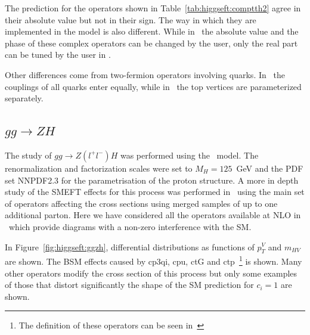 The prediction for the operators shown in Table~\ref{tab:higgseft:comptth2} agree in their absolute value but not in their sign. The way in which they are implemented in the model is also different. While in \SMEFTsim\ the absolute value and the phase of these complex operators can be changed by the user, only the real part can be tuned by the user in \SMEFTatNLO.

Other differences come from two-fermion operators involving quarks. In \SMEFTsim\ the couplings of all quarks enter equally, while in \SMEFTatNLO\ the top vertices are parameterized separately. 


\subsection{$gg\to ZH$}
\label{sec:higgseft:ggzh}
The study of  $gg\to Z(l^{+}l^{-})H$ was performed using the \SMEFTatNLO\ model. The renormalization and factorization scales were set to $M_H=125$~GeV and the PDF set NNPDF2.3 for the parametrisation of the proton structure. A more in depth study of the SMEFT effects for this process was performed in~\cite{Bylund:2016phk} using the main set of operators affecting the cross sections using merged samples of up to one additional parton. Here we have considered all the operators available at NLO in \SMEFTatNLO\ which provide diagrams with a non-zero interference with the SM.

In Figure~\ref{fig:higgseft:ggzh}, differential distributions as functions of $p_{T}^{V}$ and $m_{HV}$ are shown. The BSM effects caused by cp3qi, cpu, ctG and ctp~\footnote{The definition of these operators can be seen in~\cite{SMEFTNLOdefs}} is shown.  Many other operators modify the cross section of this process but only some examples of those that distort significantly the shape of the SM prediction for  $c_i=1$ are shown.

